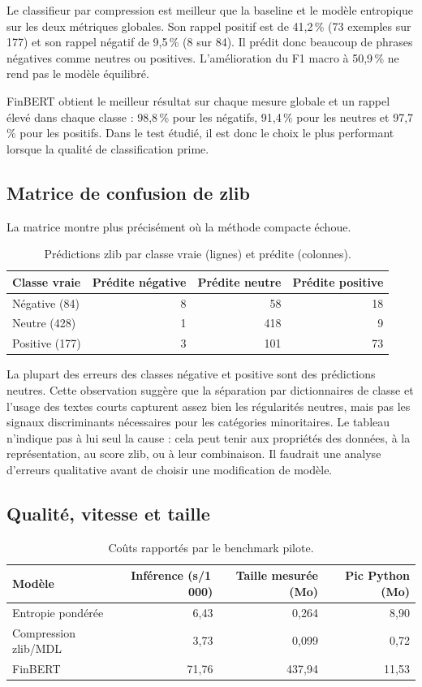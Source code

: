 \documentclass[11pt,a4paper]{article}
\begin{document}
Le classifieur par compression est meilleur que la baseline et le modèle
entropique sur les deux métriques globales. Son rappel positif est de 41,2\,\%
(73 exemples sur 177) et son rappel négatif de 9,5\,\% (8 sur 84). Il prédit
donc beaucoup de phrases négatives comme neutres ou positives. L'amélioration
du F1 macro à 50,9\,\% ne rend pas le modèle équilibré.

FinBERT obtient le meilleur résultat sur chaque mesure globale et un rappel
élevé dans chaque classe : 98,8\,\% pour les négatifs, 91,4\,\% pour les
neutres et 97,7\,\% pour les positifs. Dans le test étudié, il est donc le
choix le plus performant lorsque la qualité de classification prime.

\subsection{Matrice de confusion de zlib}
La matrice montre plus précisément où la méthode compacte échoue.

\begin{table}[ht]
\centering
\caption{Prédictions zlib par classe vraie (lignes) et prédite (colonnes).}
\label{tab:confusion}
\begin{tabular}{lrrr}
\toprule
Classe vraie & Prédite négative & Prédite neutre & Prédite positive\\
\midrule
Négative (84) & 8 & 58 & 18\\
Neutre (428) & 1 & 418 & 9\\
Positive (177) & 3 & 101 & 73\\
\bottomrule
\end{tabular}
\end{table}

La plupart des erreurs des classes négative et positive sont des prédictions
neutres. Cette observation suggère que la séparation par dictionnaires de
classe et l'usage des textes courts capturent assez bien les régularités
neutres, mais pas les signaux discriminants nécessaires pour les catégories
minoritaires. Le tableau n'indique pas à lui seul la cause : cela peut tenir
aux propriétés des données, à la représentation, au score zlib, ou à leur
combinaison. Il faudrait une analyse d'erreurs qualitative avant de choisir
une modification de modèle.

\subsection{Qualité, vitesse et taille}
\begin{table}[ht]
\centering
\caption{Coûts rapportés par le benchmark pilote.}
\label{tab:couts}
\begin{tabular}{lrrr}
\toprule
Modèle & Inférence (s/1\,000) & Taille mesurée (Mo) & Pic Python (Mo)\\
\midrule
Entropie pondérée & 6,43 & 0,264 & 8,90\\
Compression zlib/MDL & 3,73 & 0,099 & 0,72\\
FinBERT & 71,76 & 437,94 & 11,53\\
\bottomrule
\end{tabular}
\end{table}
\end{document}
